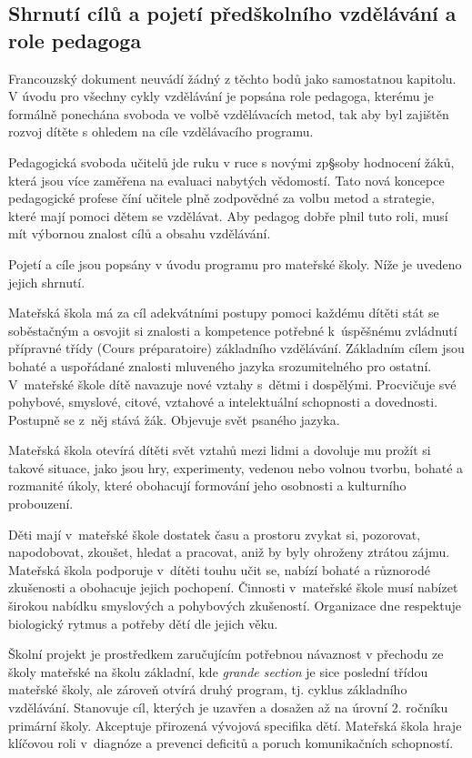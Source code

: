 \subsection{Shrnutí cílů a pojetí předškolního vzdělávání a role pedagoga}

	Francouzský dokument neuvádí žádný z těchto bodů jako samostatnou kapitolu. V úvodu pro všechny cykly vzdělávání je popsána role pedagoga, kterému je formálně ponechána svoboda ve volbě vzdělávacích metod, tak aby byl zajištěn rozvoj dítěte s ohledem na cíle vzdělávacího programu.

	Pedagogická svoboda učitelů jde ruku v ruce s novými zp§soby hodnocení žáků, která jsou více zaměřena na evaluaci nabytých vědomostí. Tato nová koncepce pedagogické profese číní učitele  plně zodpovědné za volbu metod a strategie, které mají pomoci dětem se vzdělávat. Aby pedagog dobře plnil tuto roli, musí mít výbornou znalost cílů a obsahu vzdělávání.

	Pojetí a cíle jsou popsány v úvodu programu pro mateřské školy. Níže je uvedeno jejich shrnutí.

	Mateřská škola má za cíl adekvátními postupy pomoci každému dítěti stát se soběstačným a osvojit si znalosti a kompetence potřebné k úspěšnému zvládnutí přípravné třídy (Cours préparatoire) základního vzdělávání. Základním cílem jsou bohaté a uspořádané znalosti mluveného jazyka srozumitelného pro ostatní. V mateřské škole dítě navazuje nové vztahy s dětmi i dospělými. Procvičuje své pohybové, smyslové, citové, vztahové a intelektuální schopnosti a dovednosti. Postupně se z něj stává žák. Objevuje svět psaného jazyka. 

	Mateřská škola otevírá dítěti svět vztahů mezi lidmi a dovoluje mu prožít si takové situace, jako jsou hry, experimenty, vedenou nebo volnou tvorbu, bohaté a rozmanité úkoly, které obohacují formování jeho osobnosti a kulturního probouzení. 

	Děti mají v mateřské škole dostatek času a prostoru zvykat si, pozorovat, napodobovat, zkoušet, hledat a pracovat, aniž by byly ohroženy ztrátou zájmu. Mateřská škola podporuje v dítěti touhu učit se, nabízí bohaté a různorodé zkušenosti a obohacuje jejich pochopení. 
	Činnosti v mateřské škole musí nabízet širokou nabídku smyslových a pohybových zkušeností. Organizace dne respektuje biologický rytmus a potřeby dětí dle jejich věku. 

	Školní projekt je prostředkem zaručujícím potřebnou návaznost v přechodu ze školy mateřské na školu základní, kde \textit{grande section} je sice poslední třídou mateřské školy, ale zároveň otvírá druhý program, tj. cyklus základního vzdělávání. Stanovuje cíl, kterých je uzavřen a dosažen až na úrovní 2. ročníku primární školy. Akceptuje přirozená vývojová specifika dětí. Mateřská škola hraje klíčovou roli v diagnóze a prevenci deficitů a poruch komunikačních schopností.


